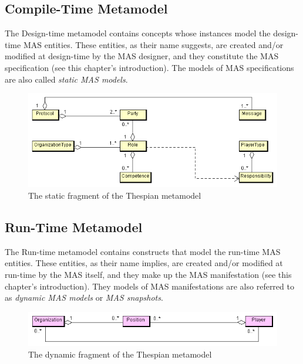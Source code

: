\subsection{Compile-Time Metamodel}	

The Design-time metamodel contains concepts whose instances model the design-time MAS entities.
These entities, as their name suggests, are created and/or modified at design-time by the MAS designer, and they constitute the MAS specification (see this chapter's introduction).
The models of MAS specifications are also called \textit{static MAS models}.

\begin{figure}[ht]
	\centering
	\includegraphics[width=\textwidth]{images/thespian/compile-time-metamodel.png}
	\caption{The static fragment of the Thespian metamodel}
	\label{figure:thespian-static-metamodel}
\end{figure}

\subsection{Run-Time Metamodel}

The Run-time metamodel contains constructs that model the run-time MAS entities.
These entities, as their name implies, are created and/or modified at run-time by the MAS itself, and they make up the MAS manifestation (see this chapter's introduction).
They models of MAS manifestations are also referred to as \textit{dynamic MAS models} or \textit{MAS snapshots}.

\begin{figure}[ht]
	\centering
	\includegraphics[width=\textwidth]{images/thespian/run-time-metamodel.png}
	\caption{The dynamic fragment of the Thespian metamodel}
	\label{figure:thespian-dynamic-metamodel}
\end{figure}


